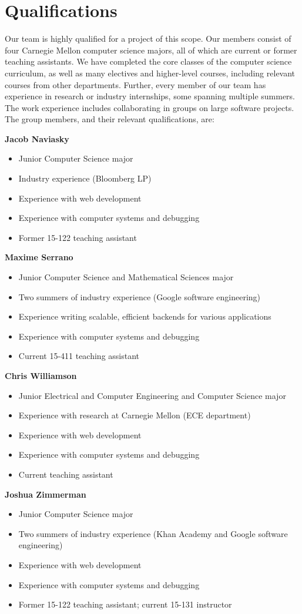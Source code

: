 \section{Qualifications}
Our team is highly qualified for a project of this
scope. Our members consist of four Carnegie
Mellon computer science majors, all of which 
are current or former teaching assistants.
We have completed the core classes of the computer
science curriculum, as well as many electives and
higher-level courses, including relevant
courses from other departments.
Further, every member of our team has experience
in research or industry internships, some spanning
multiple summers. The
work experience includes collaborating in groups
on large software projects.
The group members, and their relevant qualifications,
are:

{\bf Jacob Naviasky}
\begin{itemize}
\item Junior Computer Science major
\item Industry experience (Bloomberg LP)
\item Experience with web development
\item Experience with computer systems and debugging
\item Former 15-122 teaching assistant
\end{itemize}

{\bf Maxime Serrano}
\begin{itemize}
\item Junior Computer Science and Mathematical Sciences major
\item Two summers of industry experience (Google software engineering)
\item Experience writing scalable, efficient backends for various applications
\item Experience with computer systems and debugging
\item Current 15-411 teaching assistant
\end{itemize}

{\bf Chris Williamson}
\begin{itemize}
\item Junior Electrical and Computer Engineering and Computer Science major
\item Experience with research at Carnegie Mellon (ECE department)
\item Experience with web development
\item Experience with computer systems and debugging
\item Current teaching assistant
\end{itemize}

{\bf Joshua Zimmerman}
\begin{itemize}
\item Junior Computer Science major
\item Two summers of industry experience (Khan Academy and Google software engineering)
\item Experience with web development
\item Experience with computer systems and debugging
\item Former 15-122 teaching assistant; current 15-131 instructor
\end{itemize}